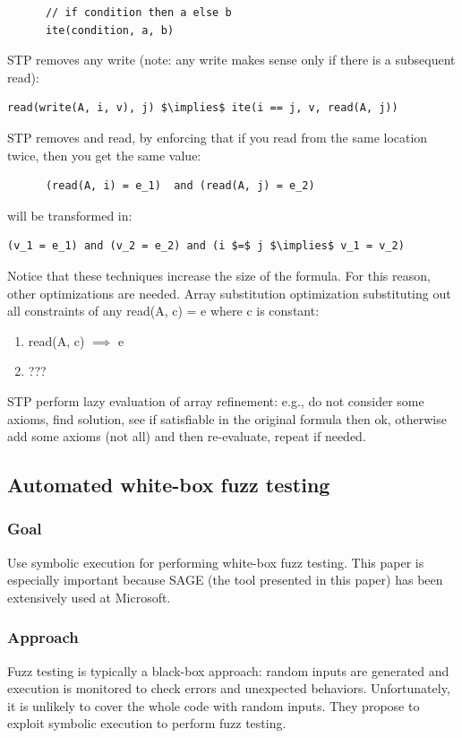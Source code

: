\documentclass[10pt, a4paper]{article}
\begin{document}
\begin{itemize}
\begin{lstlisting}
      // if condition then a else b
      ite(condition, a, b) 
    \end{lstlisting}
      STP removes any write (note: any write makes sense only if there is a subsequent read):
    \begin{lstlisting}[mathescape=true]
      read(write(A, i, v), j) $\implies$ ite(i == j, v, read(A, j))
    \end{lstlisting}
      STP removes and read, by enforcing that if you read from the same location twice, then you get the same value:
    \begin{lstlisting}
      (read(A, i) = e_1)  and (read(A, j) = e_2)
    \end{lstlisting}
    will be transformed in:
    \begin{lstlisting}[mathescape=true]
      (v_1 = e_1) and (v_2 = e_2) and (i $=$ j $\implies$ v_1 = v_2)
    \end{lstlisting}
  Notice that these techniques increase the size of the formula. For this reason, other optimizations are needed. Array substitution optimization substituting out all constraints of any read(A, c) = e where c is constant:
  \begin{enumerate}
    \item read(A, c) $\implies$ e
    \item ???
  \end{enumerate}
  STP perform lazy evaluation of array refinement: e.g., do not consider some axioms, find solution, see if satisfiable in the original formula then ok, otherwise add some axioms (not all) and then re-evaluate, repeat if needed.

\end{itemize}

\subsection{\cite{SAGE-NDSS08} Automated white-box fuzz testing} 

\subsubsection{Goal}
Use symbolic execution for performing white-box fuzz testing. This paper is especially important because SAGE (the tool presented in this paper) has been extensively used at Microsoft.

\subsubsection{Approach}
Fuzz testing is typically a black-box approach: random inputs are generated and execution is monitored to check errors and unexpected behaviors. Unfortunately, it is unlikely to cover the whole code with random inputs. They propose to exploit symbolic execution to perform fuzz testing.
\end{document}
